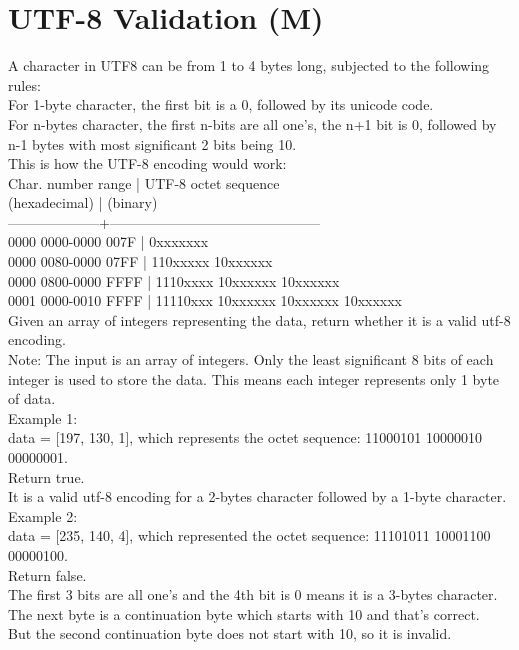 \section{UTF-8 Validation (M)}
A character in UTF8 can be from 1 to 4 bytes long, subjected to the following rules:\\
    For 1-byte character, the first bit is a 0, followed by its unicode code.\\
    For n-bytes character, the first n-bits are all one's, the n+1 bit is 0, followed by n-1 bytes with most significant 2 bits being 10.\\

This is how the UTF-8 encoding would work:\\
   Char. number range  |        UTF-8 octet sequence\\
      (hexadecimal)    |              (binary)\\
   --------------------+---------------------------------------------\\
   0000 0000-0000 007F | 0xxxxxxx\\
   0000 0080-0000 07FF | 110xxxxx 10xxxxxx\\
   0000 0800-0000 FFFF | 1110xxxx 10xxxxxx 10xxxxxx\\
   0001 0000-0010 FFFF | 11110xxx 10xxxxxx 10xxxxxx 10xxxxxx\\

Given an array of integers representing the data, return whether it is a valid utf-8 encoding.\\

Note:
The input is an array of integers. Only the least significant 8 bits of each integer is used to store the data. This means each integer represents only 1 byte of data.\\

Example 1:\\
data = [197, 130, 1], which represents the octet sequence: 11000101 10000010 00000001.\\
Return true.\\
It is a valid utf-8 encoding for a 2-bytes character followed by a 1-byte character.\\

Example 2:\\
data = [235, 140, 4], which represented the octet sequence: 11101011 10001100 00000100.\\
Return false.\\
The first 3 bits are all one's and the 4th bit is 0 means it is a 3-bytes character.\\
The next byte is a continuation byte which starts with 10 and that's correct.\\
But the second continuation byte does not start with 10, so it is invalid.\\

